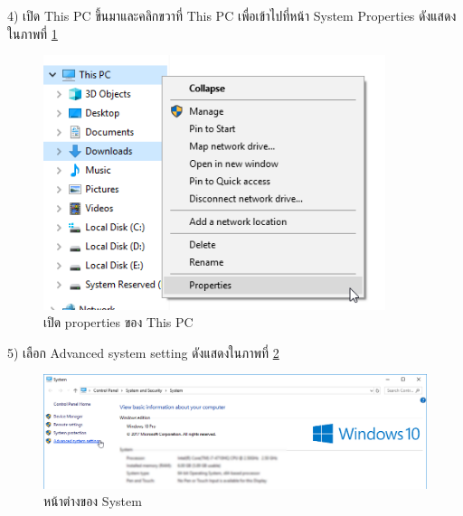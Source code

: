    4) เปิด This PC ขึ้นมาและคลิกขวาที่ This PC เพื่อเข้าไปที่หน้า System Properties ดังแสดงในภาพที่ \ref{Fig:opencvInstall4}
      \begin{figure}[H]
        \centering
          \includegraphics[width=10cm]{Figures/7/10}
          \caption{เปิด properties ของ This PC}
          \label{Fig:opencvInstall4}
      \end{figure}

    5) เลือก Advanced system setting ดังแสดงในภาพที่ \ref{Fig:opencvInstall5}
        \begin{figure}[H]
            \includegraphics[width=\columnwidth]{Figures/7/11}
            \caption{หน้าต่างของ System}
            \label{Fig:opencvInstall5}
        \end{figure}

